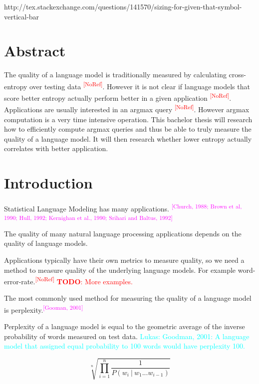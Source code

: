 \documentclass[11pt,a4paper]{article}
\title{\todo{Title}}
\author{Lukas Schmelzeisen \\ \texttt{lukas@uni-koblenz.de}}
\date{\today}
\newcommand{\todo}[1]{\textcolor{red}{\textbf{TODO}: #1}}
\newcommand{\lukas}[1]{\textcolor{cyan}{Lukas: #1}}
\newcommand{\noref}{\textcolor{red}{\small \textsuperscript{[NoRef]}}}
\newcommand{\mbref}[1]{\textcolor{magenta}{\small \textsuperscript{[#1]}}}
\newcommand\givenbase[1][]{\:#1\lvert\:}
\let\given\givenbase
\newcommand{\probCond}[2]{P(#1 \given #2)}
\begin{document}
http://tex.stackexchange.com/questions/141570/sizing-for-given-that-symbol-vertical-bar
\maketitle

\section{Abstract}

The quality of a language model is traditionally measured by calculating
cross-entropy over testing data \noref.
However it is not clear if language models that score better entropy actually
perform better in a given application \noref.
Applications are usually interested in an argmax query \noref.
However argmax computation is a very time intensive operation.
This bachelor thesis will research how to efficiently compute argmax queries and
thus be able to truly measure the quality of a language model.
It will then research whether lower entropy actually correlates with better
application.

\section{Introduction}

Statistical Language Modeling has many applications.
\mbref{Church, 1988; Brown et al, 1990; Hull, 1992; Kernighan et al., 1990;
Srihari and Baltus, 1992}

The quality of many natural language processing applications depends on the
quality of language models.

Applications typically have their own metrics to measure quality, so we need a
method to measure quality of the underlying language models.
For example word-error-rate.\noref
\todo{More examples.}

The most commonly used method for measuring the quality of a language model is
perplexity.\mbref{Gooman, 2001}

Perplexity of a language model is equal to the geometric average of the inverse
probability of words measured on test data.
\lukas{Goodman, 2001: A language model that assigned equal probability to 100
words would have perplexity 100.}

\begin{equation}
  \sqrt[n]{\prod_{i=1}^n\frac{1}{\probCond{w_i}{w_1 ... w_{i-1}}}}
\end{equation}
\end{document}
